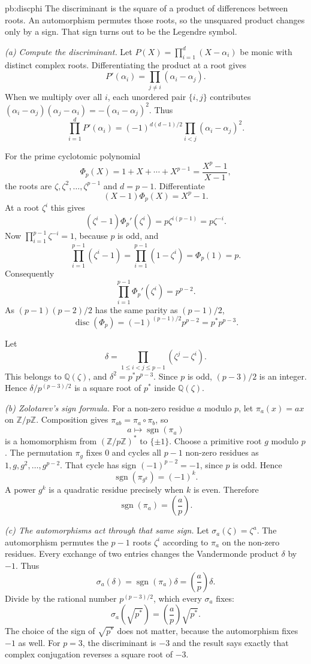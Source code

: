 \begin{solution}{pb:discphi}
\idea The discriminant is the square of a product of differences between roots. An automorphism permutes those roots, so the unsquared product changes only by a sign. That sign turns out to be the Legendre symbol.

\writeup \emph{(a) Compute the discriminant.}
Let $P(X)=\prod_{i=1}^d(X-\alpha_i)$ be monic with distinct complex roots. Differentiating the product at a root gives
\[
P'(\alpha_i)=\prod_{j\ne i}(\alpha_i-\alpha_j).
\]
When we multiply over all $i$, each unordered pair $\{i,j\}$ contributes
$(\alpha_i-\alpha_j)(\alpha_j-\alpha_i)=-(\alpha_i-\alpha_j)^2$. Thus
\[
\prod_{i=1}^dP'(\alpha_i)
=(-1)^{d(d-1)/2}\prod_{i<j}(\alpha_i-\alpha_j)^2.
\]

For the prime cyclotomic polynomial
\[
\Phi_p(X)=1+X+\cdots+X^{p-1}
=\frac{X^p-1}{X-1},
\]
the roots are $\zeta,\zeta^2,\ldots,\zeta^{p-1}$ and $d=p-1$. Differentiate
\[
(X-1)\Phi_p(X)=X^p-1.
\]
At a root $\zeta^i$ this gives
\[
(\zeta^i-1)\Phi_p'(\zeta^i)
=p\zeta^{i(p-1)}=p\zeta^{-i}.
\]
Now $\prod_{i=1}^{p-1}\zeta^{-i}=1$, because $p$ is odd, and
\[
\prod_{i=1}^{p-1}(\zeta^i-1)
=\prod_{i=1}^{p-1}(1-\zeta^i)=\Phi_p(1)=p.
\]
Consequently
\[
\prod_{i=1}^{p-1}\Phi_p'(\zeta^i)=p^{p-2}.
\]
As $(p-1)(p-2)/2$ has the same parity as $(p-1)/2$,
\[
\boxed{\operatorname{disc}(\Phi_p)
=(-1)^{(p-1)/2}p^{p-2}=p^*p^{p-3}.}
\]

Let
\[
\delta=\prod_{1\le i<j\le p-1}(\zeta^j-\zeta^i).
\]
This belongs to $\mathbb Q(\zeta)$, and $\delta^2=p^*p^{p-3}$. Since $p$ is odd, $(p-3)/2$ is an integer. Hence $\delta/p^{(p-3)/2}$ is a square root of $p^*$ inside $\mathbb Q(\zeta)$.

\emph{(b) Zolotarev's sign formula.}
For a non-zero residue $a$ modulo $p$, let $\pi_a(x)=ax$ on $\mathbb Z/p\mathbb Z$. Composition gives $\pi_{ab}=\pi_a\circ\pi_b$, so
\[
a\longmapsto\operatorname{sgn}(\pi_a)
\]
is a homomorphism from $(\mathbb Z/p\mathbb Z)^*$ to $\{\pm1\}$. Choose a primitive root $g$ modulo $p$. The permutation $\pi_g$ fixes $0$ and cycles all $p-1$ non-zero residues as
$1,g,g^2,\ldots,g^{p-2}$. That cycle has sign $(-1)^{p-2}=-1$, since $p$ is odd. Hence
\[
\operatorname{sgn}(\pi_{g^k})=(-1)^k.
\]
A power $g^k$ is a quadratic residue precisely when $k$ is even. Therefore
\[
\boxed{\operatorname{sgn}(\pi_a)=\left(\frac ap\right)}.
\]

\emph{(c) The automorphisms act through that same sign.}
Let $\sigma_a(\zeta)=\zeta^a$. The automorphism permutes the $p-1$ roots $\zeta^i$ according to $\pi_a$ on the non-zero residues. Every exchange of two entries changes the Vandermonde product $\delta$ by $-1$. Thus
\[
\sigma_a(\delta)=\operatorname{sgn}(\pi_a)\delta
=\left(\frac ap\right)\delta.
\]
Divide by the rational number $p^{(p-3)/2}$, which every $\sigma_a$ fixes:
\[
\boxed{\sigma_a(\sqrt{p^*})
=\left(\frac ap\right)\sqrt{p^*}.}
\]
The choice of the sign of $\sqrt{p^*}$ does not matter, because the automorphism fixes $-1$ as well. For $p=3$, the discriminant is $-3$ and the result says exactly that complex conjugation reverses a square root of $-3$.


\end{solution}
